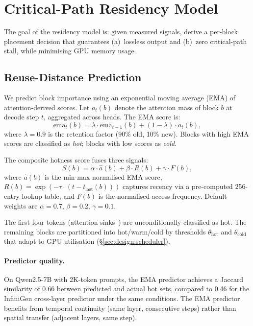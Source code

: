 \documentclass[acmsmall,nonacm,screen]{acmart}
\begin{document}
\section{Critical-Path Residency Model}\label{sec:model}

The goal of the residency model is: given measured signals, derive a
per-block placement decision that guarantees (a)~lossless output and
(b)~zero critical-path stall, while minimising GPU memory usage.

\subsection{Reuse-Distance Prediction}\label{sec:model:reuse}

We predict block importance using an exponential moving average (EMA) of
attention-derived scores.  Let $a_t(b)$ denote the attention mass of block
$b$ at decode step $t$, aggregated across heads.  The EMA score is:
\begin{equation}\label{eq:ema}
  \text{ema}_t(b) = \lambda \cdot \text{ema}_{t-1}(b) + (1-\lambda) \cdot a_t(b),
\end{equation}
where $\lambda = 0.9$ is the retention factor (90\% old, 10\% new).  Blocks
with high EMA scores are classified as \emph{hot}; blocks with low scores
as \emph{cold}.

The composite hotness score fuses three signals:
\begin{equation}\label{eq:hotness}
  S(b) = \alpha \cdot \hat{a}(b) + \beta \cdot R(b) + \gamma \cdot F(b),
\end{equation}
where $\hat{a}(b)$ is the min-max normalised EMA score, $R(b) =
\exp(-\tau \cdot (t - t_{\text{last}}(b)))$ captures recency via a
pre-computed 256-entry lookup table, and $F(b)$ is the normalised access
frequency.  Default weights are $\alpha=0.7$, $\beta=0.2$, $\gamma=0.1$.

The first four tokens (attention sinks~\cite{xiao2024streamingllm}) are
unconditionally classified as hot.  The remaining blocks are partitioned
into hot/warm/cold by thresholds $\theta_\text{hot}$ and
$\theta_\text{cold}$ that adapt to GPU utilisation
(\S\ref{sec:design:scheduler}).

\paragraph{Predictor quality.}
On Qwen2.5-7B with 2K-token prompts, the EMA predictor achieves a
Jaccard similarity of 0.66 between predicted and actual hot sets, compared
to 0.46 for the InfiniGen cross-layer predictor under the same conditions.
The EMA predictor benefits from temporal continuity (same layer, consecutive
steps) rather than spatial transfer (adjacent layers, same step).
\end{document}
